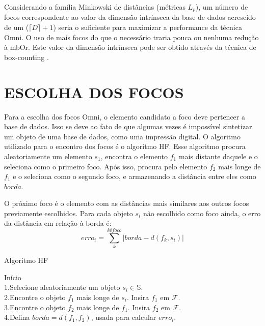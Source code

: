 Considerando a família Minkowski de distâncias (métricas $L_p$), um número de focos correspondente ao valor da
dimensão intrínseca da base de dados acrescido de um ($\lceil D \rceil +1$) seria o suficiente para maximizar a performance da técnica Omni. O uso de mais focos do que o 
necessário traria pouca ou nenhuma redução à mbOr. Este valor da dimensão intrínseca pode ser obtido através da técnica de box-counting \cite{Block1990}.

\section{ESCOLHA DOS FOCOS}
\label{sec:escoco}
Para a escolha dos focos Omni, o elemento candidato a foco deve pertencer a base de dados. Isso se deve ao fato de que algumas vezes
é impossível sintetizar um objeto de uma base de dados, como uma impressão digital. O algoritmo utilizado para o encontro dos focos
é o algoritmo HF. Esse algoritmo procura aleatoriamente um elemento $s_1$, encontra o elemento $f_1$ mais distante daquele e o seleciona como
o primeiro foco. Após isso, procura pelo elemento $f_2$ mais longe de $f_1$ e o seleciona como o segundo foco, e armazenando
a distância entre eles como $borda$.\par

O próximo foco é o elemento com as distâncias mais similares aos outros focos previamente escolhidos. Para cada objeto
$s_i$ não escolhido como foco ainda, o erro da distância em relação à borda é:
\begin{equation}
 erro_i = \sum_{k}^{k é foco} |borda - d(f_k, s_i)|
\end{equation}

\begin{algorithm}
\label{alg:hf}
    \caption{Algoritmo HF}
    Início\\
       1.Selecione aleatoriamente um objeto $s_i \in \mathbb{S}$.\\
       2.Encontre o objeto $f_1$ mais longe de $s_i$. Insira $f_1$ em $\mathscr{F}$.\\
       3.Encontre o objeto $f_2$ mais longe de $f_1$. Insira $f_2$ em $\mathscr{F}$.\\
       4.Defina $borda=d(f_1,f_2)$, usada para calcular $erro_i$.\\
\end{algorithm}

